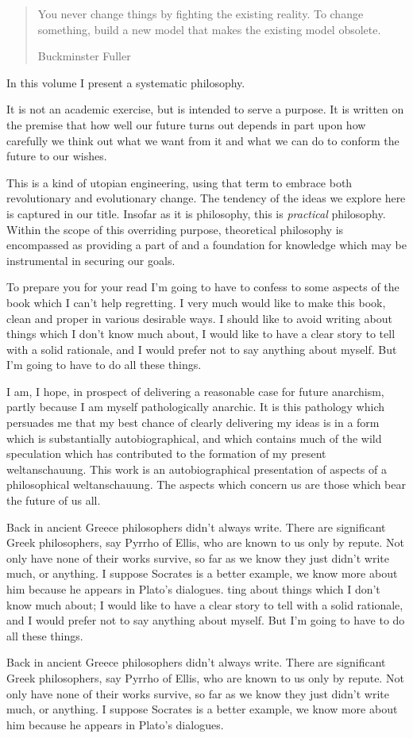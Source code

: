 \begin{quote}
You never change things by fighting the existing reality. To change something, build a new model that makes the existing model obsolete.

Buckminster Fuller

\end{quote}



In this volume I present a systematic philosophy.

It is not an academic exercise, but is intended to serve a purpose.
It is written on the premise that how well our future turns out depends in part upon how carefully we think out what we want from it and what we can do to conform the future to our wishes.

This is a kind of utopian engineering, using that term to embrace both revolutionary and evolutionary change.
The tendency of the ideas we explore here is captured in our title.
Insofar as it is philosophy, this is {\it practical} philosophy.
Within the scope of this overriding purpose, theoretical philosophy is encompassed as providing a part of and a foundation for knowledge which may be instrumental in securing our goals.

To prepare you for your read I'm going to have to confess to some aspects of the book which I can't help regretting.
I very much would like to make this book, clean and proper in various desirable ways.
I should like to avoid writing about things which I don't know much about, I would like to have a clear story to tell with a solid rationale, and I would prefer not to say anything about myself.
But I'm going to have to do all these things.

I am, I hope, in prospect of delivering a reasonable case for future anarchism, partly because I am myself pathologically anarchic.
It is this pathology which persuades me that my best chance of clearly delivering my ideas is in a form which is substantially autobiographical, and which contains much of the wild speculation which has contributed to the formation of my present weltanschauung.
This work is an autobiographical presentation of aspects of a philosophical weltanschauung.
The aspects which concern us are those which bear the future of us all.

Back in ancient Greece philosophers didn't always write.
There are significant Greek philosophers, say Pyrrho of Ellis, who are known to us only by repute.
Not only have none of their works survive, so far as we know they just didn't write much, or anything.
I suppose Socrates is a better example, we know more about him because he appears in Plato's dialogues.
ting about things which I don't know much about; I would like to have a clear story to tell with a solid rationale, and I would prefer not to say anything about myself.
But I'm going to have to do all these things.

Back in ancient Greece philosophers didn't always write.
There are significant Greek philosophers, say Pyrrho of Ellis, who are known to us only by repute.
Not only have none of their works survive, so far as we know they just didn't write much, or anything.
I suppose Socrates is a better example, we know more about him because he appears in Plato's dialogues.
